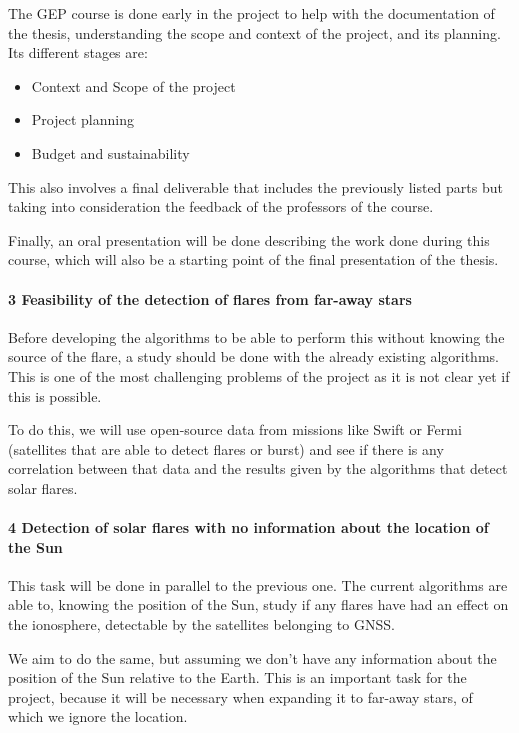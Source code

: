 The GEP course is done early in the project to help with the documentation of the thesis, understanding the scope and context of the project, and its planning. Its different stages are:

\begin{itemize}
	\item Context and Scope of the project
	\item Project planning
	\item Budget and sustainability
\end{itemize}

This also involves a final deliverable that includes the previously listed parts but taking into consideration the feedback of the professors of the course.

Finally, an oral presentation will be done describing the work done during this course, which will also be a starting point of the final presentation of the thesis.

\paragraph{3 Feasibility of the detection of flares from far-away stars}

Before developing the algorithms to be able to perform this without knowing the source of the flare, a study should be done with the already existing algorithms. This is one of the most challenging problems of the project as it is not clear yet if this is possible.

To do this, we will use open-source data from missions like Swift or Fermi (satellites that are able to detect flares or burst) and see if there is any correlation between that data and the results given by the algorithms that detect solar flares.

\paragraph{4 Detection of solar flares with no information about the location of the Sun}

This task will be done in parallel to the previous one. The current algorithms are able to, knowing the position of the Sun, study if any flares have had an effect on the ionosphere, detectable by the satellites belonging to GNSS. 

We aim to do the same, but assuming we don’t have any information about the position of the Sun relative to the Earth. This is an important task for the project, because it will be necessary when expanding it to far-away stars, of which we ignore the location.

